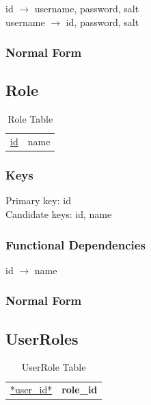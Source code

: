 \documentclass[11pt]{article}
\begin{document}
    id $\rightarrow$ username, password, salt\\
    username $\rightarrow$ id, password, salt
\subsubsection{Normal Form}
\label{sec-3-1-3}


    
\subsection{Role}
\label{sec-3-2}


\begin{table}[htb]
\caption{Role Table} 
\begin{center}
\begin{tabular}{ll}
 \underline{id}  &  name  \\
\end{tabular}
\end{center}
\end{table}
\subsubsection{Keys}
\label{sec-3-2-1}

    
    Primary key: id\\
    Candidate keys: id, name
\subsubsection{Functional Dependencies}
\label{sec-3-2-2}


    id $\rightarrow$ name
\subsubsection{Normal Form}
\label{sec-3-2-3}
\subsection{UserRoles}
\label{sec-3-3}


\begin{table}[htb]
\caption{UserRole Table} 
\begin{center}
\begin{tabular}{ll}
 \underline{*user\_id*}  &  \textbf{role\_id}  \\
\end{tabular}
\end{center}
\end{table}
\end{document}

